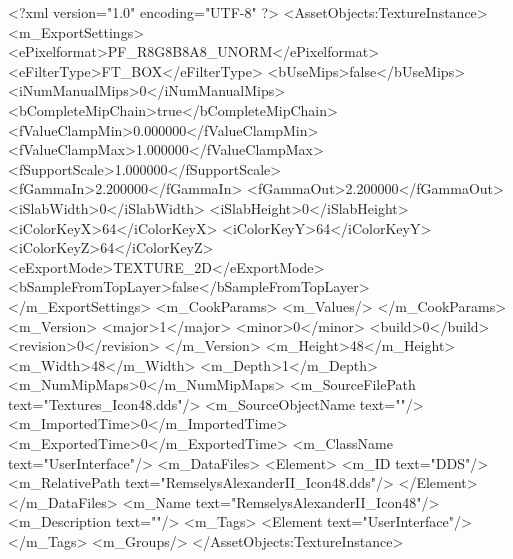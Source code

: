 <?xml version="1.0" encoding="UTF-8" ?>
<AssetObjects:TextureInstance>
	<m_ExportSettings>
		<ePixelformat>PF_R8G8B8A8_UNORM</ePixelformat>
		<eFilterType>FT_BOX</eFilterType>
		<bUseMips>false</bUseMips>
		<iNumManualMips>0</iNumManualMips>
		<bCompleteMipChain>true</bCompleteMipChain>
		<fValueClampMin>0.000000</fValueClampMin>
		<fValueClampMax>1.000000</fValueClampMax>
		<fSupportScale>1.000000</fSupportScale>
		<fGammaIn>2.200000</fGammaIn>
		<fGammaOut>2.200000</fGammaOut>
		<iSlabWidth>0</iSlabWidth>
		<iSlabHeight>0</iSlabHeight>
		<iColorKeyX>64</iColorKeyX>
		<iColorKeyY>64</iColorKeyY>
		<iColorKeyZ>64</iColorKeyZ>
		<eExportMode>TEXTURE_2D</eExportMode>
		<bSampleFromTopLayer>false</bSampleFromTopLayer>
	</m_ExportSettings>
	<m_CookParams>
		<m_Values/>
	</m_CookParams>
	<m_Version>
		<major>1</major>
		<minor>0</minor>
		<build>0</build>
		<revision>0</revision>
	</m_Version>
	<m_Height>48</m_Height>
	<m_Width>48</m_Width>
	<m_Depth>1</m_Depth>
	<m_NumMipMaps>0</m_NumMipMaps>
	<m_SourceFilePath text="Textures\RemselysAlexanderII_Icon48.dds"/>
	<m_SourceObjectName text=""/>
	<m_ImportedTime>0</m_ImportedTime>
	<m_ExportedTime>0</m_ExportedTime>
	<m_ClassName text="UserInterface"/>
	<m_DataFiles>
		<Element>
			<m_ID text="DDS"/>
			<m_RelativePath text="RemselysAlexanderII_Icon48.dds"/>
		</Element>
	</m_DataFiles>
	<m_Name text="RemselysAlexanderII_Icon48"/>
	<m_Description text=""/>
	<m_Tags>
		<Element text="UserInterface"/>
	</m_Tags>
	<m_Groups/>
</AssetObjects:TextureInstance>
